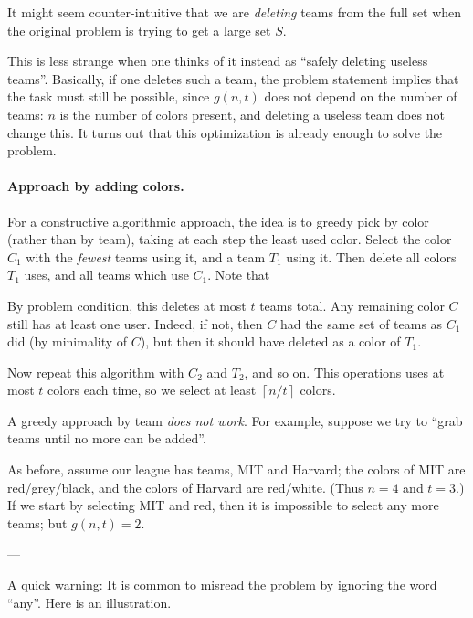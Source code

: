 \begin{remark*}
  It might seem counter-intuitive
  that we are \emph{deleting} teams from the full set
  when the original problem is trying to get a large set $S$.

  This is less strange when one thinks
  of it instead as ``safely deleting useless teams''.
  Basically, if one deletes such a team,
  the problem statement implies that the task must still be possible,
  since $g(n,t)$ does not depend on the number of teams:
  $n$ is the number of colors present,
  and deleting a useless team does not change this.
  It turns out that this optimization is already enough to solve the problem.
\end{remark*}

\paragraph{Approach by adding colors.}
For a constructive algorithmic approach,
the idea is to greedy pick by color (rather than by team),
taking at each step the least used color.
Select the color $C_1$ with the \emph{fewest} teams using it,
and a team $T_1$ using it.
Then delete all colors $T_1$ uses, and all teams which use $C_1$.
Note that
\begin{itemize}
  \ii By problem condition,
  this deletes at most $t$ teams total.
  \ii Any remaining color $C$ still has at least one user.
  Indeed, if not, then $C$ had the same set of teams
  as $C_1$ did (by minimality of $C$),
  but then it should have deleted as a color of $T_1$.
\end{itemize}

Now repeat this algorithm with $C_2$ and $T_2$, and so on.
This operations uses at most $t$ colors each time,
so we select at least $\left\lceil n/t \right\rceil$ colors.

\begin{remark*}
  A greedy approach by team \emph{does not work}.
  For example, suppose we try to ``grab teams until no more can be added''.

  As before, assume our league has teams, MIT and Harvard;
  the colors of MIT are red/grey/black, and
  the colors of Harvard are red/white.
  (Thus $n=4$ and $t=3$.)
  If we start by selecting MIT and red, then
  it is impossible to select any more teams; but $g(n,t) = 2$.
\end{remark*}

---

A quick warning:
It is common to misread the problem by ignoring the word ``any''.
Here is an illustration.

